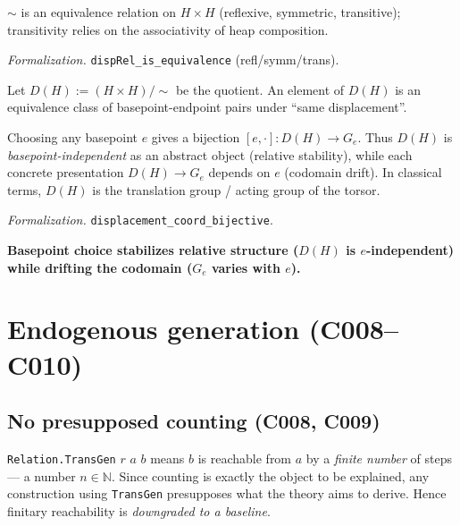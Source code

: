 \documentclass[sigplan,10pt,anonymous,review]{acmart}
\theoremstyle{remark}
\begin{document}
\begin{theorem}[equivalence, C007]\label{thm:equiv}
$\sim$ is an equivalence relation on $H \times H$ (reflexive, symmetric, transitive);
transitivity relies on the associativity of heap composition.
\end{theorem}
\emph{Formalization.} \texttt{dispRel\_is\_equivalence} (refl/symm/trans).

\begin{definition}\label{def:D}
Let $D(H) := (H \times H)/{\sim}$ be the quotient. An element of $D(H)$ is an
equivalence class of basepoint-endpoint pairs under ``same displacement''.
\end{definition}

\begin{theorem}[recovery, C007]\label{thm:recover}
Choosing any basepoint $e$ gives a bijection $[e, \cdot] : D(H) \to G_e$. Thus $D(H)$
is \textit{basepoint-independent} as an abstract object (relative stability), while
each concrete presentation $D(H) \to G_e$ depends on $e$ (codomain drift). In
classical terms, $D(H)$ is the translation group / acting group of the torsor.
\end{theorem}
\emph{Formalization.} \texttt{displacement\_coord\_bijective}.

\begin{corollary}\label{cor:dichotomy}
\textbf{Basepoint choice stabilizes relative structure ($D(H)$ is $e$-independent)
while drifting the codomain ($G_e$ varies with $e$).}
\end{corollary}

\section{Endogenous generation (C008--C010)}

\subsection{No presupposed counting (C008, C009)}

\begin{definition}\label{def:finitary}
\texttt{Relation.TransGen} $r$ $a$ $b$ means $b$ is reachable from $a$ by a
\textit{finite number} of steps --- a number $n \in \mathbb{N}$. Since counting is
exactly the object to be explained, any construction using \texttt{TransGen}
presupposes what the theory aims to derive. Hence finitary reachability is
\textit{downgraded to a baseline}.
\end{definition}
\end{document}
